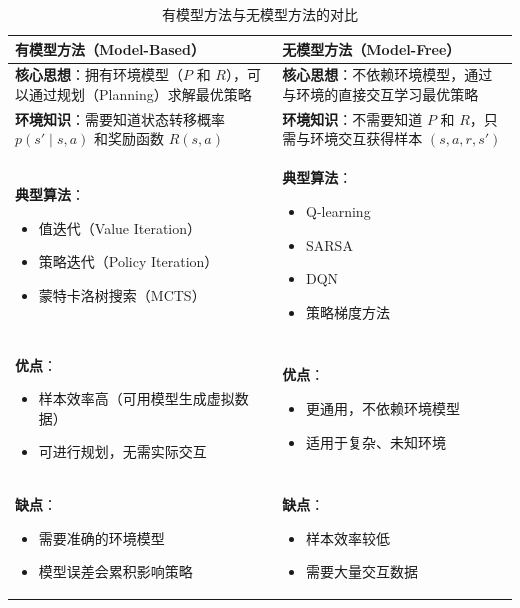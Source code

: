 \begin{table}[H]
\centering
\caption{有模型方法与无模型方法的对比}
\begin{tabular}{p{}p{}}
\toprule
\textbf{有模型方法（Model-Based）} & \textbf{无模型方法（Model-Free）} \\
\midrule
\textbf{核心思想}：拥有环境模型（$P$ 和 $R$），可以通过规划（Planning）求解最优策略 & \textbf{核心思想}：不依赖环境模型，通过与环境的直接交互学习最优策略 \\
\hline
\textbf{环境知识}：需要知道状态转移概率 $p(s' \mid s, a)$ 和奖励函数 $R(s, a)$ & \textbf{环境知识}：不需要知道 $P$ 和 $R$，只需与环境交互获得样本 $(s, a, r, s')$ \\
\hline
\textbf{典型算法}：
\begin{itemize}
    \item 值迭代（Value Iteration）
    \item 策略迭代（Policy Iteration）
    \item 蒙特卡洛树搜索（MCTS）
\end{itemize} & \textbf{典型算法}：
\begin{itemize}
    \item Q-learning
    \item SARSA
    \item DQN
    \item 策略梯度方法
\end{itemize} \\
\hline
\textbf{优点}：
\begin{itemize}
    \item 样本效率高（可用模型生成虚拟数据）
    \item 可进行规划，无需实际交互
\end{itemize} & \textbf{优点}：
\begin{itemize}
    \item 更通用，不依赖环境模型
    \item 适用于复杂、未知环境
\end{itemize} \\
\hline
\textbf{缺点}：
\begin{itemize}
    \item 需要准确的环境模型
    \item 模型误差会累积影响策略
\end{itemize} & \textbf{缺点}：
\begin{itemize}
    \item 样本效率较低
    \item 需要大量交互数据
\end{itemize} \\
\bottomrule
\end{tabular}
\end{table}

